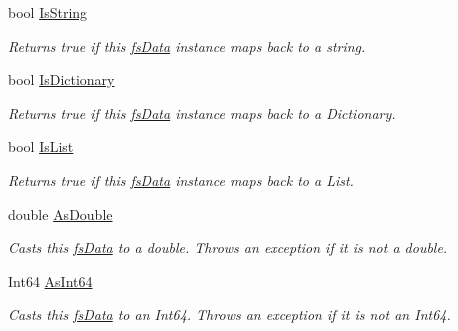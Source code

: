 \begin{DoxyCompactItemize}
bool \hyperlink{class_full_serializer_1_1fs_data_a95589f68382f863386617a0dd4055ae4}{Is\+String}
\begin{DoxyCompactList}\small\item\em Returns true if this \hyperlink{class_full_serializer_1_1fs_data}{fs\+Data} instance maps back to a string. \end{DoxyCompactList}\item 
bool \hyperlink{class_full_serializer_1_1fs_data_a493e25ed3252e4a381a1cd47b9a1559e}{Is\+Dictionary}
\begin{DoxyCompactList}\small\item\em Returns true if this \hyperlink{class_full_serializer_1_1fs_data}{fs\+Data} instance maps back to a Dictionary. \end{DoxyCompactList}\item 
bool \hyperlink{class_full_serializer_1_1fs_data_a1d61e9ed3a74d32dc46f9a4d4c1285f7}{Is\+List}
\begin{DoxyCompactList}\small\item\em Returns true if this \hyperlink{class_full_serializer_1_1fs_data}{fs\+Data} instance maps back to a List. \end{DoxyCompactList}\item 
double \hyperlink{class_full_serializer_1_1fs_data_a3b742582f73e3eb166bcc6df88b2ffd9}{As\+Double}
\begin{DoxyCompactList}\small\item\em Casts this \hyperlink{class_full_serializer_1_1fs_data}{fs\+Data} to a double. Throws an exception if it is not a double. \end{DoxyCompactList}\item 
Int64 \hyperlink{class_full_serializer_1_1fs_data_a47a5cdaefdb6afc7f2bdaa026befdc00}{As\+Int64}
\begin{DoxyCompactList}\small\item\em Casts this \hyperlink{class_full_serializer_1_1fs_data}{fs\+Data} to an Int64. Throws an exception if it is not an Int64. \end{DoxyCompactList}\item 

\end{DoxyCompactItemize}
